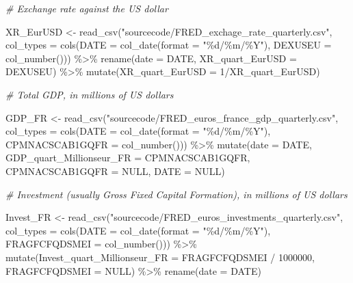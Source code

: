 \documentclass[
]{article}
\newenvironment{Shaded}{\begin{snugshade}}{\end{snugshade}}
\newcommand{\AttributeTok}[1]{\textcolor[rgb]{0.77,0.63,0.00}{#1}}
\newcommand{\CommentTok}[1]{\textcolor[rgb]{0.56,0.35,0.01}{\textit{#1}}}
\newcommand{\ConstantTok}[1]{\textcolor[rgb]{0.00,0.00,0.00}{#1}}
\newcommand{\DecValTok}[1]{\textcolor[rgb]{0.00,0.00,0.81}{#1}}
\newcommand{\FunctionTok}[1]{\textcolor[rgb]{0.00,0.00,0.00}{#1}}
\newcommand{\NormalTok}[1]{#1}
\newcommand{\OtherTok}[1]{\textcolor[rgb]{0.56,0.35,0.01}{#1}}
\newcommand{\SpecialCharTok}[1]{\textcolor[rgb]{0.00,0.00,0.00}{#1}}
\newcommand{\StringTok}[1]{\textcolor[rgb]{0.31,0.60,0.02}{#1}}
\begin{document}
\begin{Shaded}
\begin{Highlighting}[]
\CommentTok{\# Exchange rate against the US dollar}

\NormalTok{XR\_EurUSD }\OtherTok{\textless{}{-}} \FunctionTok{read\_csv}\NormalTok{(}\StringTok{"sourcecode/FRED\_exchage\_rate\_quarterly.csv"}\NormalTok{, }
    \AttributeTok{col\_types =} \FunctionTok{cols}\NormalTok{(}\AttributeTok{DATE =} \FunctionTok{col\_date}\NormalTok{(}\AttributeTok{format =} \StringTok{"\%d/\%m/\%Y"}\NormalTok{), }
        \AttributeTok{DEXUSEU =} \FunctionTok{col\_number}\NormalTok{())) }\SpecialCharTok{\%\textgreater{}\%}
  \FunctionTok{rename}\NormalTok{(}\AttributeTok{date =}\NormalTok{ DATE, }\AttributeTok{XR\_quart\_EurUSD =}\NormalTok{ DEXUSEU) }\SpecialCharTok{\%\textgreater{}\%}
  \FunctionTok{mutate}\NormalTok{(}\AttributeTok{XR\_quart\_EurUSD =} \DecValTok{1}\SpecialCharTok{/}\NormalTok{XR\_quart\_EurUSD)}


\CommentTok{\# Total GDP, in millions of US dollars}

\NormalTok{GDP\_FR }\OtherTok{\textless{}{-}} \FunctionTok{read\_csv}\NormalTok{(}\StringTok{"sourcecode/FRED\_euros\_france\_gdp\_quarterly.csv"}\NormalTok{, }
    \AttributeTok{col\_types =} \FunctionTok{cols}\NormalTok{(}\AttributeTok{DATE =} \FunctionTok{col\_date}\NormalTok{(}\AttributeTok{format =} \StringTok{"\%d/\%m/\%Y"}\NormalTok{), }
        \AttributeTok{CPMNACSCAB1GQFR =} \FunctionTok{col\_number}\NormalTok{())) }\SpecialCharTok{\%\textgreater{}\%}
  \FunctionTok{mutate}\NormalTok{(}\AttributeTok{date =}\NormalTok{ DATE, }\AttributeTok{GDP\_quart\_Millionseur\_FR =}\NormalTok{ CPMNACSCAB1GQFR,}
         \AttributeTok{CPMNACSCAB1GQFR =} \ConstantTok{NULL}\NormalTok{, }\AttributeTok{DATE =} \ConstantTok{NULL}\NormalTok{)}


\CommentTok{\# Investment (usually Gross Fixed Capital Formation), in millions of US dollars}

\NormalTok{Invest\_FR }\OtherTok{\textless{}{-}} \FunctionTok{read\_csv}\NormalTok{(}\StringTok{"sourcecode/FRED\_euros\_investments\_quarterly.csv"}\NormalTok{, }
    \AttributeTok{col\_types =} \FunctionTok{cols}\NormalTok{(}\AttributeTok{DATE =} \FunctionTok{col\_date}\NormalTok{(}\AttributeTok{format =} \StringTok{"\%d/\%m/\%Y"}\NormalTok{), }
        \AttributeTok{FRAGFCFQDSMEI =} \FunctionTok{col\_number}\NormalTok{())) }\SpecialCharTok{\%\textgreater{}\%}
  \FunctionTok{mutate}\NormalTok{(}\AttributeTok{Invest\_quart\_Millionseur\_FR =}\NormalTok{ FRAGFCFQDSMEI }\SpecialCharTok{/} \DecValTok{1000000}\NormalTok{,}
         \AttributeTok{FRAGFCFQDSMEI =} \ConstantTok{NULL}\NormalTok{) }\SpecialCharTok{\%\textgreater{}\%}
  \FunctionTok{rename}\NormalTok{(}\AttributeTok{date =}\NormalTok{ DATE)}



\end{Highlighting}
\end{Shaded}
\end{document}
